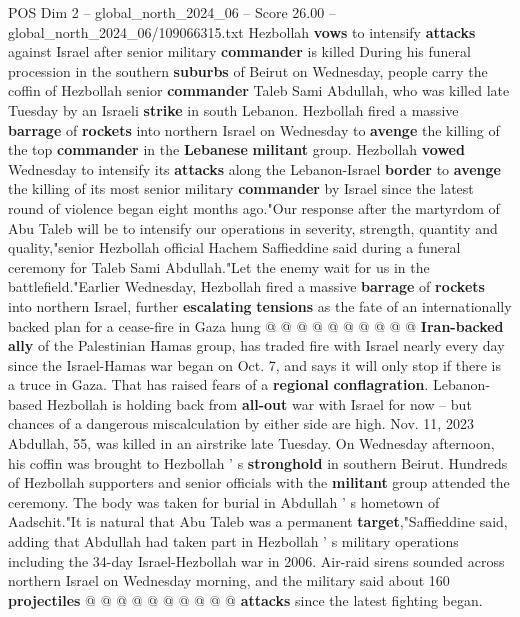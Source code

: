 \begin{textsample}{POS Dim 2 – global\_north\_2024\_06 – Score 26.00 – global\_north\_2024\_06/109066315.txt}  \label{ex:f2_pos_312}
Hezbollah \textbf{vows} to intensify \textbf{attacks} against Israel after senior military \textbf{commander} is killed During his funeral procession in the southern \textbf{suburbs} of Beirut on Wednesday, people carry the coffin of Hezbollah senior \textbf{commander} Taleb Sami Abdullah, who was killed late Tuesday by an Israeli \textbf{strike} in south Lebanon.
Hezbollah fired a massive \textbf{barrage} of \textbf{rockets} into northern Israel on Wednesday to \textbf{avenge} the killing of the top \textbf{commander} in the \textbf{Lebanese} \textbf{militant} group.
Hezbollah \textbf{vowed} Wednesday to intensify its \textbf{attacks} along the Lebanon-Israel \textbf{border} to \textbf{avenge} the killing of its most senior military \textbf{commander} by Israel since the latest round of violence began eight months ago."Our response after the martyrdom of Abu Taleb will be to intensify our operations in severity, strength, quantity and quality,"senior Hezbollah official Hachem Saffieddine said during a funeral ceremony for Taleb Sami Abdullah."Let the enemy wait for us in the battlefield."Earlier Wednesday, Hezbollah fired a massive \textbf{barrage} of \textbf{rockets} into northern Israel, further \textbf{escalating} \textbf{tensions} as the fate of an internationally backed plan for a cease-fire in Gaza hung @ @ @ @ @ @ @ @ @ @ \textbf{Iran-backed} \textbf{ally} of the Palestinian Hamas group, has traded fire with Israel nearly every day since the Israel-Hamas war began on Oct. 7, and says it will only stop if there is a truce in Gaza.
That has raised fears of a \textbf{regional} \textbf{conflagration}.
Lebanon-based Hezbollah is holding back from \textbf{all-out} war with Israel for now -- but chances of a dangerous miscalculation by either side are high.
Nov. 11, 2023 Abdullah, 55, was killed in an airstrike late Tuesday.
On Wednesday afternoon, his coffin was brought to Hezbollah ' s \textbf{stronghold} in southern Beirut.
Hundreds of Hezbollah supporters and senior officials with the \textbf{militant} group attended the ceremony.
The body was taken for burial in Abdullah ' s hometown of Aadschit."It is natural that Abu Taleb was a permanent \textbf{target},"Saffieddine said, adding that Abdullah had taken part in Hezbollah ' s military operations including the 34-day Israel-Hezbollah war in 2006.
Air-raid sirens sounded across northern Israel on Wednesday morning, and the military said about 160 \textbf{projectiles} @ @ @ @ @ @ @ @ @ @ \textbf{attacks} since the latest fighting began.

\end{textsample}
